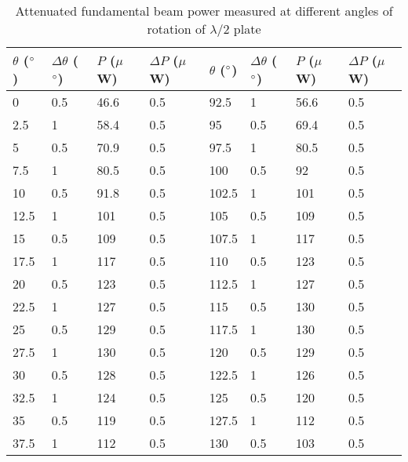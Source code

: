 \begin{table}[h!]
\centering
\caption{Attenuated fundamental beam power measured at different angles of rotation of $\lambda /2$ plate}
\label{tab:variabattcalib}
\begin{tabular}{|l|l|l|l||l|l|l|l|}
\hline
$\theta$ ($\degree$) & $\Delta \theta$ ($\degree$) & $P$ ($\mu$W) & $\Delta P$ ($\mu$W) & $\theta$ ($\degree$) & $\Delta \theta$ ($\degree$) & $P$ ($\mu$W) & $\Delta P$ ($\mu$W) \\ \hline
0     & 0.5         & 46.6    & 0.5     & 92.5  & 1           & 56.6    & 0.5     \\ \hline
2.5   & 1           & 58.4    & 0.5     & 95    & 0.5         & 69.4    & 0.5     \\ \hline
5     & 0.5         & 70.9    & 0.5     & 97.5  & 1           & 80.5    & 0.5     \\ \hline
7.5   & 1           & 80.5    & 0.5     & 100   & 0.5         & 92      & 0.5     \\ \hline
10    & 0.5         & 91.8    & 0.5     & 102.5 & 1           & 101     & 0.5     \\ \hline
12.5  & 1           & 101     & 0.5     & 105   & 0.5         & 109     & 0.5     \\ \hline
15    & 0.5         & 109     & 0.5     & 107.5 & 1           & 117     & 0.5     \\ \hline
17.5  & 1           & 117     & 0.5     & 110   & 0.5         & 123     & 0.5     \\ \hline
20    & 0.5         & 123     & 0.5     & 112.5 & 1           & 127     & 0.5     \\ \hline
22.5  & 1           & 127     & 0.5     & 115   & 0.5         & 130     & 0.5     \\ \hline
25    & 0.5         & 129     & 0.5     & 117.5 & 1           & 130     & 0.5     \\ \hline
27.5  & 1           & 130     & 0.5     & 120   & 0.5         & 129     & 0.5     \\ \hline
30    & 0.5         & 128     & 0.5     & 122.5 & 1           & 126     & 0.5     \\ \hline
32.5  & 1           & 124     & 0.5     & 125   & 0.5         & 120     & 0.5     \\ \hline
35    & 0.5         & 119     & 0.5     & 127.5 & 1           & 112     & 0.5     \\ \hline
37.5  & 1           & 112     & 0.5     & 130   & 0.5         & 103     & 0.5     \\ \hline

\end{tabular}
\end{table}
